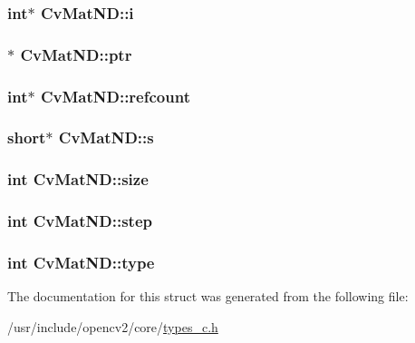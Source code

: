 \hypertarget{structCvMatND_a080d27a015fe6e2013b06074f20bc2f5}{
\subsubsection[{i}]{\setlength{\rightskip}{0pt plus 5cm}int$\ast$ Cv\-Mat\-N\-D\-::i}}\label{structCvMatND_a080d27a015fe6e2013b06074f20bc2f5}
\hypertarget{structCvMatND_ad1e711b18cfc94d53ec060d15b6639ef}{
\subsubsection[{ptr}]{$\ast$ Cv\-Mat\-N\-D\-::ptr}}\label{structCvMatND_ad1e711b18cfc94d53ec060d15b6639ef}
\hypertarget{structCvMatND_a7841f93b088acc0c064fa26a1b0571fc}{
\subsubsection[{refcount}]{\setlength{\rightskip}{0pt plus 5cm}int$\ast$ Cv\-Mat\-N\-D\-::refcount}}\label{structCvMatND_a7841f93b088acc0c064fa26a1b0571fc}
\hypertarget{structCvMatND_a52c677f77f43b7d472c92a3e99199dd3}{
\subsubsection[{s}]{\setlength{\rightskip}{0pt plus 5cm}short$\ast$ Cv\-Mat\-N\-D\-::s}}\label{structCvMatND_a52c677f77f43b7d472c92a3e99199dd3}
\hypertarget{structCvMatND_a26c11a958cc01cc2afce53049f4dac87}{
\subsubsection[{size}]{\setlength{\rightskip}{0pt plus 5cm}int Cv\-Mat\-N\-D\-::size}}\label{structCvMatND_a26c11a958cc01cc2afce53049f4dac87}
\hypertarget{structCvMatND_ae94dea9c705fa9beab9505cdb92f38b2}{
\subsubsection[{step}]{\setlength{\rightskip}{0pt plus 5cm}int Cv\-Mat\-N\-D\-::step}}\label{structCvMatND_ae94dea9c705fa9beab9505cdb92f38b2}
\hypertarget{structCvMatND_ae555c16ced9ddfb8cb3fbd867cadece9}{
\subsubsection[{type}]{\setlength{\rightskip}{0pt plus 5cm}int Cv\-Mat\-N\-D\-::type}}\label{structCvMatND_ae555c16ced9ddfb8cb3fbd867cadece9}


The documentation for this struct was generated from the following file\-:\begin{DoxyCompactItemize}
\item 
/usr/include/opencv2/core/\hyperlink{core_2types__c_8h}{types\-\_\-c.\-h}\end{DoxyCompactItemize}
